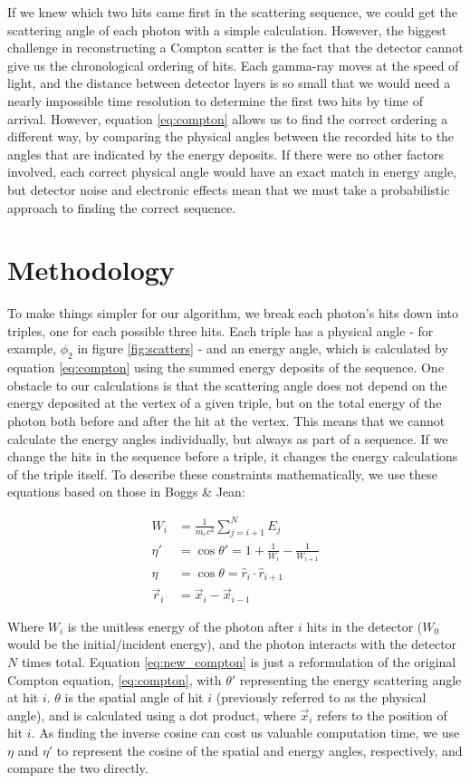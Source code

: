 If we knew which two hits came first in the scattering sequence, we could get the scattering angle of each photon with a simple calculation. However, the biggest challenge in reconstructing a Compton scatter is the fact that the detector cannot give us the chronological ordering of hits. Each gamma-ray moves at the speed of light, and the distance between detector layers is so small that we would need a nearly impossible time resolution to determine the first two hits by time of arrival. However, equation \ref{eq:compton} allows us to find the correct ordering a different way, by comparing the physical angles between the recorded hits to the angles that are indicated by the energy deposits. If there were no other factors involved, each correct physical angle would have an exact match in energy angle, but detector noise and electronic effects mean that we must take a probabilistic approach to finding the correct sequence.

\section{Methodology}
To make things simpler for our algorithm, we break each photon's hits down into triples, one for each possible three hits. Each triple has a physical angle - for example, $\phi_2$ in figure \ref{fig:scatters} - and an energy angle, which is calculated by equation \ref{eq:compton} using the summed energy deposits of the sequence. One obstacle to our calculations is that the scattering angle does not depend on the energy deposited at the vertex of a given triple, but on the total energy of the photon both before and after the hit at the vertex. This means that we cannot calculate the energy angles individually, but always as part of a sequence. If we change the hits in the sequence before a triple, it changes the energy calculations of the triple itself. To describe these constraints mathematically, we use these equations based on those in Boggs \& Jean\cite{Boggs}:

\begin{align}
    W_i &= \frac{1}{m_ec^2}\sum_{j=i+1}^N E_j\\
    \label{eq:new_compton}\eta' &= \cos\theta' = 1+\frac{1}{W_i}-\frac{1}{W_{i+1}}\\
    \eta &= \cos\theta = \hat{r}_i \cdot \hat{r}_{i+1}\\
    \vec{r}_i &= \vec{x}_i - \vec{x}_{i-1}
\end{align}

Where $W_i$ is the unitless energy of the photon after $i$ hits in the detector ($W_0$ would be the initial/incident energy), and the photon interacts with the detector $N$ times total. Equation \ref{eq:new_compton} is just a reformulation of the original Compton equation, \ref{eq:compton}, with $\theta'$ representing the energy scattering angle at hit $i$. $\theta$ is the spatial angle of hit $i$ (previously referred to as the physical angle), and is calculated using a dot product, where $\vec{x}_i$ refers to the position of hit $i$. As finding the inverse cosine can cost us valuable computation time, we use $\eta$ and $\eta'$ to represent the cosine of the spatial and energy angles, respectively, and compare the two directly.

